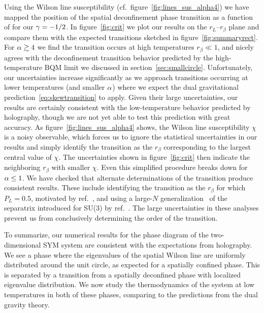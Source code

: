 Using the Wilson line susceptibility (cf.\ figure~\ref{fig:lines_sus_alpha4}) we have mapped the position of the spatial deconfinement phase transition as a function of \al for our $\gamma = -1 / 2$.
In figure~\ref{fig:crit} we plot our results on the $r_L$--$r_{\beta}$ plane and compare them with the expected transitions sketched in figure~\ref{fig:summaryrect}.
For $\alpha \gtrsim 4$ we find the transition occurs at high temperatures $r_{\beta} \ll 1$, and nicely agrees with the deconfinement transition behavior predicted by the high-temperature BQM limit we discussed in section~\ref{sec:smallcircle}.
Unfortunately, our uncertainties increase significantly as we approach transitions occurring at lower temperatures (and smaller $\alpha$) where we expect the dual gravitational prediction~\eqref{eq:skewtransition} to apply.
Given their large uncertainties, our results are certainly consistent with the low-temperature behavior predicted by holography, though we are not yet able to test this prediction with great accuracy.
As figure~\ref{fig:lines_sus_alpha4} shows, the Wilson line susceptibility $\chi$ is a noisy observable, which forces us to ignore the statistical uncertainties in our results and simply identify the transition as the $r_{\beta}$ corresponding to the largest central value of $\chi$.
The uncertainties shown in figure~\ref{fig:crit} then indicate the neighboring $r_{\beta}$ with smaller $\chi$.
Even this simplified procedure breaks down for $\alpha \leq 1$.
We have checked that alternate determinations of the transition produce consistent results.
These include identifying the transition as the $r_{\beta}$ for which $P_L = 0.5$, motivated by ref.~\cite{Aharony:2004ig}, and using a large-$N$ generalization~\cite{Hudspith:2017BU} of the separatrix introduced for SU(3) by ref.~\cite{Francis:2015lha}.
The large uncertainties in these analyses prevent us from conclusively determining the order of the transition.

To summarize, our numerical results for the phase diagram of the two-dimensional SYM system are consistent with the expectations from holography.
We see a phase where the eigenvalues of the spatial Wilson line are uniformly distributed around the unit circle, as expected for a spatially confined phase.
This is separated by a transition from a spatially deconfined phase with localized eigenvalue distribution.
We now study the thermodynamics of the system at low temperatures in both of these phases, comparing to the predictions from the dual gravity theory.

